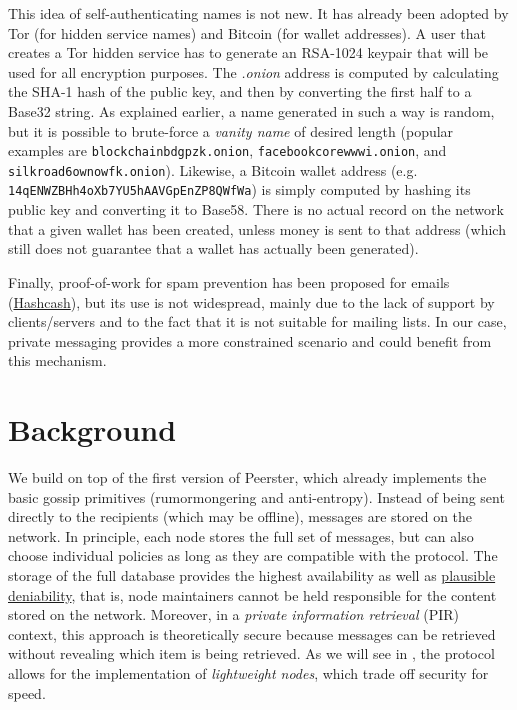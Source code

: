 \documentclass[a4paper,12pt]{article}
\begin{document}
This idea of self-authenticating names is not new. It has already been adopted by Tor (for hidden service names) and Bitcoin (for wallet addresses). A user that creates a Tor hidden service has to generate an RSA-1024 keypair that will be used for all encryption purposes. The \emph{.onion} address is computed by calculating the SHA-1 hash of the public key, and then by converting the first half to a Base32 string. As explained earlier, a name generated in such a way is random, but it is possible to brute-force a \emph{vanity name} of desired length (popular examples are \texttt{blockchainbdgpzk.onion}, \texttt{facebookcorewwwi.onion}, and \texttt{silkroad6ownowfk.onion}). Likewise, a Bitcoin wallet address (e.g. \texttt{14qENWZBHh4oXb7YU5hAAVGpEnZP8QWfWa}) is simply computed by hashing its public key and converting it to Base58. There is no actual record on the network that a given wallet has been created, unless money is sent to that address (which still does not guarantee that a wallet has actually been generated).

Finally, proof-of-work for spam prevention has been proposed for emails (\href{https://en.wikipedia.org/wiki/Hashcash}{Hashcash}), but its use is not widespread, mainly due to the lack of support by clients/servers and to the fact that it is not suitable for mailing lists. In our case, private messaging provides a more constrained scenario and could benefit from this mechanism.

\section{Background} %
We build on top of the first version of Peerster, which already implements the basic gossip primitives (rumormongering and anti-entropy). Instead of being sent directly to the recipients (which may be offline), messages are stored on the network. In principle, each node stores the full set of messages, but can also choose individual policies as long as they are compatible with the protocol. The storage of the full database provides the highest availability as well as \href{https://en.wikipedia.org/wiki/Plausible\_deniability}{plausible deniability}, that is, node maintainers cannot be held responsible for the content stored on the network. Moreover, in a \emph{private information retrieval} (PIR) context, this approach is theoretically secure because messages can be retrieved without revealing which item is being retrieved. As we will see in , the protocol allows for the implementation of \emph{lightweight nodes}, which trade off security for speed.
\end{document}
